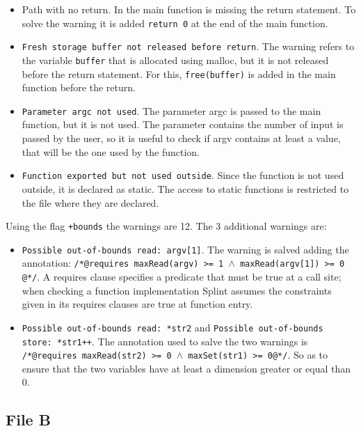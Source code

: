 \documentclass[a4paper]{article}
\begin{document}
\begin{itemize}
    \item \texttt{}{Path with no return}. In the main function is missing the return statement. To
        solve the warning it is added \texttt{return 0} at the end of the main function.

    \item \texttt{Fresh storage buffer not released before return}. The warning refers to the variable 
        \texttt{buffer} that is allocated using malloc, but it is not released before the return statement.
        For this, \texttt{free(buffer)} is added in the main function before the return.

    \item \texttt{Parameter argc not used}. The parameter argc is passed to the main function, but
        it is not used. The parameter contains the number of input is passed by the user, so it is useful
        to check if argv contains at least a value, that will be the one used by the function. 
    
    \item \texttt{Function exported but not used outside}. Since the function is not used outside, it
        is declared as static. The access to static functions is restricted to the file where they are declared.
\end{itemize}

Using the flag \texttt{+bounds} the warnings are 12. The 3 additional warnings are: 
\begin{itemize}
    \item \texttt{Possible out-of-bounds read: argv[1]}. The warning is salved adding the annotation: 
        \texttt{/*@requires maxRead(argv) >= 1 $\wedge$ maxRead(argv[1]) >= 0 @*/}. A requires clause specifies a predicate
        that must be true at a call site; when checking a function implementation Splint assumes the
        constraints given in its requires clauses are true at function entry.
    \item \texttt{Possible out-of-bounds read: *str2} and \texttt{Possible out-of-bounds store: *str1++}.
        The annotation used to salve the two warnings is \texttt{/*@requires maxRead(str2) >= 0 $\wedge$ maxSet(str1) >= 0@*/}. 
        So as to ensure that the two variables have at least a dimension greater or equal than 0.
\end{itemize}


\subsection*{File B}
\end{document}
